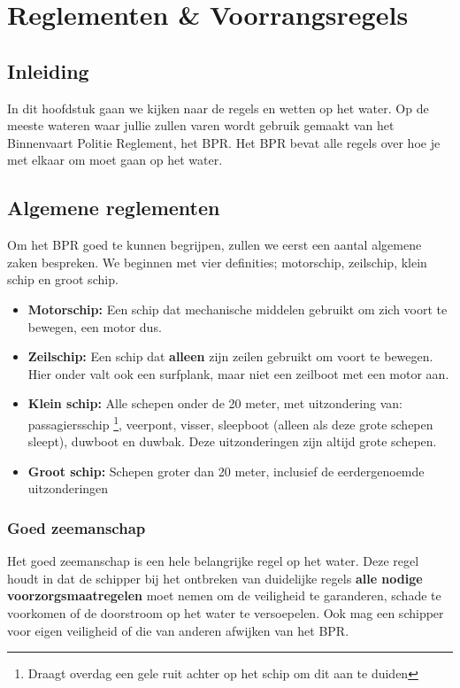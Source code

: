 \chapter{Reglementen \& Voorrangsregels}
\section{Inleiding}
In dit hoofdstuk gaan we kijken naar de regels en wetten op het water. Op de meeste wateren waar jullie zullen varen wordt gebruik gemaakt van het Binnenvaart Politie Reglement, het BPR. Het BPR bevat alle regels over hoe je met elkaar om moet gaan op het water.

\section{Algemene reglementen}
Om het BPR goed te kunnen begrijpen, zullen we eerst een aantal algemene zaken bespreken. We beginnen met vier definities; motorschip, zeilschip, klein schip en groot schip. 

\begin{itemize}
    \item \textbf{Motorschip:} Een schip dat mechanische middelen gebruikt om zich voort te bewegen, een motor dus.
    \item \textbf{Zeilschip:} Een schip dat \textbf{alleen} zijn zeilen gebruikt om voort te bewegen. Hier onder valt ook een surfplank, maar niet een zeilboot met een motor aan.
    \item \textbf{Klein schip:} Alle schepen onder de 20 meter, met uitzondering van: passagiersschip \footnote{Draagt overdag een gele ruit achter op het schip om dit aan te duiden}, veerpont, visser, sleepboot
(alleen als deze grote schepen sleept), duwboot en duwbak. Deze uitzonderingen zijn altijd grote schepen. 
    \item \textbf{Groot schip:} Schepen groter dan 20 meter, inclusief de eerdergenoemde uitzonderingen 
\end{itemize}

\subsection{Goed zeemanschap}
Het goed zeemanschap is een hele belangrijke regel op het water. Deze regel houdt in dat de schipper bij het ontbreken van duidelijke regels \textbf{alle nodige voorzorgsmaatregelen} moet nemen om de veiligheid te garanderen, schade te voorkomen of de doorstroom op het water te versoepelen. Ook mag een schipper voor eigen veiligheid of die van anderen afwijken van het BPR.

